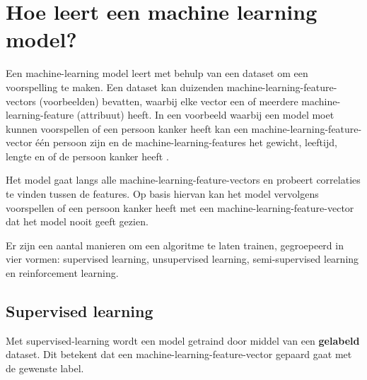 

\section{Hoe leert een machine learning model?}\label{sec:hoe-leert-een-machine-learning-model}
Een \gls{machine-learning} model leert met behulp van een dataset om een voorspelling te maken. Een dataset kan duizenden \glspl{machine-learning-feature-vector} (voorbeelden) bevatten, waarbij elke vector een of meerdere \gls{machine-learning-feature} (attribuut) heeft. In een voorbeeld waarbij een model moet kunnen voorspellen of een persoon kanker heeft kan een \gls{machine-learning-feature-vector} één persoon zijn en de \glspl{machine-learning-feature} het gewicht, leeftijd, lengte en of de persoon kanker heeft \cite{google-ml-terminology}.

Het model gaat langs alle \glspl{machine-learning-feature-vector} en probeert correlaties te vinden tussen de features. Op basis hiervan kan het model vervolgens voorspellen of een persoon kanker heeft met een \gls{machine-learning-feature-vector} dat het model nooit geeft gezien.

Er zijn een aantal manieren om een algoritme te laten trainen, gegroepeerd in vier vormen: supervised learning, unsupervised learning, semi-supervised learning en reinforcement learning.

\subsection{Supervised learning}\label{subsec:supervised-learning}
Met \gls{supervised-learning} wordt een model getraind door middel van een \textbf{gelabeld} dataset. Dit betekent dat een \gls{machine-learning-feature-vector} gepaard gaat met de gewenste label.

